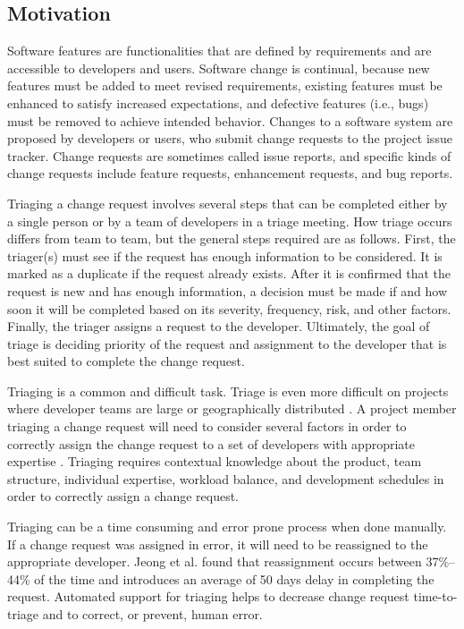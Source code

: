 \documentclass[12pt,draft]{Manuscript}
\begin{document}
\begin{body}
\subsection{Motivation}\label{motivation-2}

Software features are functionalities that are defined by requirements
and are accessible to developers and users. Software change is
continual, because new features must be added to meet revised
requirements, existing features must be enhanced to satisfy increased
expectations, and defective features (i.e., bugs) must be removed to
achieve intended behavior. Changes to a software system are proposed by
developers or users, who submit change requests to the project issue
tracker. Change requests are sometimes called issue reports, and
specific kinds of change requests include feature requests, enhancement
requests, and bug reports.

Triaging a change request involves several steps that can be completed
either by a single person or by a team of developers in a triage
meeting. How triage occurs differs from team to team, but the general
steps required are as follows. First, the triager(s) must see if the
request has enough information to be considered. It is marked as a
duplicate if the request already exists. After it is confirmed that the
request is new and has enough information, a decision must be made if
and how soon it will be completed based on its severity, frequency,
risk, and other factors. Finally, the triager assigns a request to the
developer. Ultimately, the goal of triage is deciding priority of the
request and assignment to the developer that is best suited to complete
the change request.

Triaging is a common and difficult task. Triage is even more difficult
on projects where developer teams are large or geographically
distributed \citep{Herbsleb-etal:2001}. A project member triaging a
change request will need to consider several factors in order to
correctly assign the change request to a set of developers with
appropriate expertise \citep{McDonald-Ackerman:1998}. Triaging requires
contextual knowledge about the product, team structure, individual
expertise, workload balance, and development schedules in order to
correctly assign a change request.

Triaging can be a time consuming and error prone process when done
manually. If a change request was assigned in error, it will need to be
reassigned to the appropriate developer. Jeong et al.
\citep{Jeong-etal:2009} found that reassignment occurs between
37\%--44\% of the time and introduces an average of 50 days delay in
completing the request. Automated support for triaging helps to decrease
change request time-to-triage and to correct, or prevent, human error.


\end{body}
\end{document}
